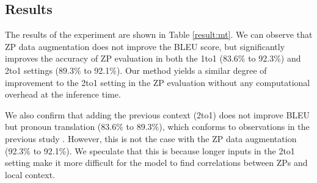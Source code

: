 \subsection{Results}
The results of the experiment are shown in Table \ref{result:mt}.
We can observe that ZP data augmentation does not improve the BLEU score, but significantly improves the accuracy of ZP evaluation in both the 1to1 (83.6\% to 92.3\%) and 2to1 settings (89.3\% to 92.1\%). Our method yields a similar degree of improvement to the 2to1 setting in the ZP evaluation without any computational overhead at the inference time.

We also confirm that adding the previous context (2to1) does not improve BLEU but pronoun translation (83.6\% to 89.3\%), which conforms to observations in the previous study \citep{Jean2017DoesNM,shimazu-etal-2020-evaluation}.
However, this is not the case with the ZP data augmentation (92.3\% to 92.1\%).
We speculate that this is because longer inputs in the 2to1 setting make it more difficult for the model to find correlations between ZPs and local context.
